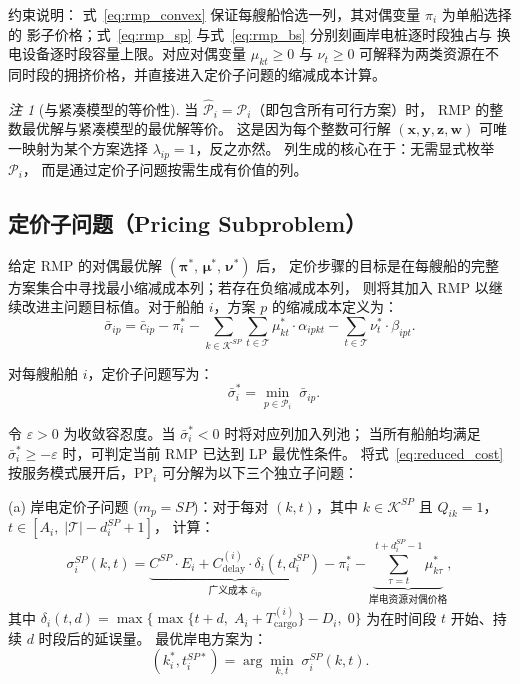 \documentclass[UTF8, a4paper, 12pt]{ctexart}
\theoremstyle{plain}
\theoremstyle{definition}
\theoremstyle{remark}
\newtheorem{remark}{注}
\begin{document}
\noindent 约束说明：
式~\eqref{eq:rmp_convex} 保证每艘船恰选一列，其对偶变量 $\pi_i$ 为单船选择的
影子价格；式~\eqref{eq:rmp_sp} 与式~\eqref{eq:rmp_bs} 分别刻画岸电桩逐时段独占与
换电设备逐时段容量上限。对应对偶变量 $\mu_{kt} \ge 0$ 与 $\nu_t \ge 0$
可解释为两类资源在不同时段的拥挤价格，并直接进入定价子问题的缩减成本计算。

\begin{remark}[与紧凑模型的等价性]
当 $\hat{\mathcal{P}}_i = \mathcal{P}_i$（即包含所有可行方案）时，
RMP 的整数最优解与紧凑模型的最优解等价。
这是因为每个整数可行解
$(\mathbf{x}, \mathbf{y}, \mathbf{z}, \mathbf{w})$
可唯一映射为某个方案选择 $\lambda_{ip} = 1$，反之亦然。
列生成的核心在于：无需显式枚举 $\mathcal{P}_i$，
而是通过定价子问题按需生成有价值的列。
\end{remark}

\subsection{定价子问题（Pricing Subproblem）}
\label{sec:cg_pricing}

给定 RMP 的对偶最优解 $(\boldsymbol{\pi}^*,\, \boldsymbol{\mu}^*,\, \boldsymbol{\nu}^*)$ 后，
定价步骤的目标是在每艘船的完整方案集合中寻找最小缩减成本列；若存在负缩减成本列，
则将其加入 RMP 以继续改进主问题目标值。对于船舶 $i$，方案 $p$ 的缩减成本定义为：
\begin{equation}
  \bar{\sigma}_{ip}
  = \bar{c}_{ip}
  - \pi_i^*
  - \sum_{k \in \mathcal{K}^{SP}} \sum_{t \in \mathcal{T}}
    \mu_{kt}^* \cdot \alpha_{ipkt}
  - \sum_{t \in \mathcal{T}} \nu_t^* \cdot \beta_{ipt}.
  \label{eq:reduced_cost}
\end{equation}

对每艘船舶 $i$，定价子问题写为：
\begin{equation}
  [\text{PP}_i] \qquad
  \bar{\sigma}_i^* =
  \min_{p \in \mathcal{P}_i} \; \bar{\sigma}_{ip}.
  \label{eq:pricing}
\end{equation}

令 $\varepsilon>0$ 为收敛容忍度。当 $\bar{\sigma}_i^*<0$ 时将对应列加入列池；
当所有船舶均满足 $\bar{\sigma}_i^*\ge -\varepsilon$ 时，可判定当前 RMP 已达到 LP 最优性条件。
将式~\eqref{eq:reduced_cost} 按服务模式展开后，$\text{PP}_i$ 可分解为以下三个独立子问题：

\medskip
\noindent(a) 岸电定价子问题
($m_p = SP$)：对于每对 $(k, t)$，其中 $k \in \mathcal{K}^{SP}$
且 $Q_{ik} = 1$，$t \in [A_i,\; |\mathcal{T}| - d_i^{SP} + 1]$，
计算：
\begin{equation}
  \sigma_i^{SP}(k, t)
  = \underbrace{C^{SP} \cdot E_i + C_{\text{delay}}^{(i)} \cdot \delta_i(t, d_i^{SP})}_{
    \text{广义成本 } \bar{c}_{ip}}
  - \pi_i^*
  - \underbrace{\sum_{\tau = t}^{t + d_i^{SP} - 1} \mu_{k\tau}^*}_{
    \text{岸电资源对偶价格}},
  \label{eq:price_sp}
\end{equation}
其中 $\delta_i(t, d) = \max\!\big\{\max\{t + d,\; A_i + T_{\text{cargo}}^{(i)}\} - D_i,\; 0\big\}$
为在时间段 $t$ 开始、持续 $d$ 时段后的延误量。
最优岸电方案为：
\begin{equation}
  (k_i^*, t_i^{SP*}) = \arg\min_{k, t} \; \sigma_i^{SP}(k, t).
  \label{eq:price_sp_opt}
\end{equation}
\end{document}
